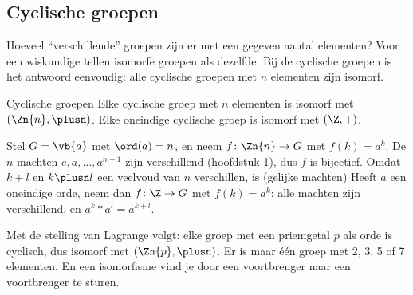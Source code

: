 \subsection{Cyclische groepen}

Hoeveel ``verschillende'' groepen zijn er met een gegeven aantal elementen? Voor een wiskundige tellen isomorfe groepen als dezelfde. Bij de cyclische groepen is het antwoord eenvoudig: alle cyclische groepen met $n$ elementen zijn isomorf.

\begin{theorie}
\begin{stelling}{Cyclische groepen}
Elke cyclische groep met $n$ elementen is isomorf met $(\Zn{n}, \plusn)$. Elke oneindige cyclische groep is isomorf met $(\Z, +)$.
\end{stelling}

\begin{bewijs}
Stel $G = \vb{a}$ met $\ord(a) = n$, en neem $f \colon \Zn{n} \to G$ met $f(k) = a^k$. De $n$ machten $e, a, \ldots, a^{n - 1}$ zijn verschillend (hoofdstuk 1), dus $f$ is bijectief. Omdat $k + l$ en $k \plusn l$ een veelvoud van $n$ verschillen, is (gelijke machten)
Heeft $a$ een oneindige orde, neem dan $f \colon \Z \to G$ met $f(k) = a^k$: alle machten zijn verschillend, en $a^k \ast a^l = a^{k + l}$.
\end{bewijs}
\end{theorie}

Met de stelling van Lagrange volgt: elke groep met een priemgetal $p$ als orde is cyclisch, dus isomorf met $(\Zn{p}, \plusn)$. Er is maar één groep met 2, 3, 5 of 7 elementen. En een isomorfisme vind je door een voortbrenger naar een voortbrenger te sturen.


